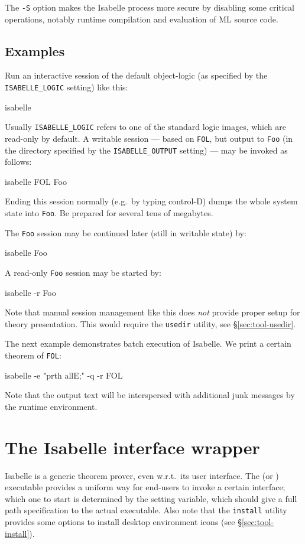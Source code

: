 \medskip The \texttt{-S} option makes the Isabelle process more secure
by disabling some critical operations, notably runtime compilation and
evaluation of ML source code.


\subsection*{Examples}

Run an interactive session of the default object-logic (as specified
by the \texttt{ISABELLE_LOGIC} setting) like this:
\begin{ttbox}
isabelle
\end{ttbox}
Usually \texttt{ISABELLE_LOGIC} refers to one of the standard logic
images, which are read-only by default.  A writable session --- based
on \texttt{FOL}, but output to \texttt{Foo} (in the directory
specified by the \texttt{ISABELLE_OUTPUT} setting) --- may be invoked
as follows:
\begin{ttbox}
isabelle FOL Foo
\end{ttbox}
Ending this session normally (e.g.\ by typing control-D) dumps the whole {\ML}
system state into \texttt{Foo}. Be prepared for several tens of megabytes.

The \texttt{Foo} session may be continued later (still in writable
state) by:
\begin{ttbox}
isabelle Foo
\end{ttbox}
A read-only \texttt{Foo} session may be started by:
\begin{ttbox}
isabelle -r Foo
\end{ttbox}

\medskip Note that manual session management like this does \emph{not} provide
proper setup for theory presentation.  This would require the \texttt{usedir}
utility, see \S\ref{sec:tool-usedir}.

\bigskip The next example demonstrates batch execution of Isabelle. We print a
certain theorem of \texttt{FOL}:
\begin{ttbox}
isabelle -e "prth allE;" -q -r FOL
\end{ttbox}
Note that the output text will be interspersed with additional junk messages
by the {\ML} runtime environment.


\section{The Isabelle interface wrapper}\label{sec:interface}

Isabelle is a generic theorem prover, even w.r.t.\ its user interface.  The
 (or ) executable provides a
uniform way for end-users to invoke a certain interface; which one to start is
determined by the  setting variable, which should
give a full path specification to the actual executable.  Also note that the
\texttt{install} utility provides some options to install desktop environment
icons (see \S\ref{sec:tool-install}).


